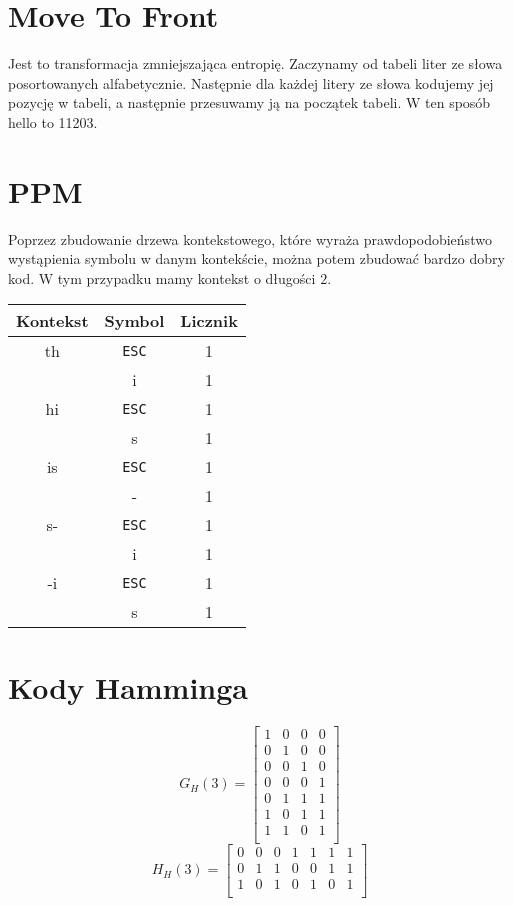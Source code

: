\documentclass{../notatki}
\begin{document}
\begin{multicols}{2}
  \section{Move To Front}

  Jest to transformacja zmniejszająca entropię. Zaczynamy od tabeli liter
  ze słowa posortowanych alfabetycznie. Następnie dla każdej litery ze słowa
  kodujemy jej pozycję w tabeli, a następnie przesuwamy ją na początek
  tabeli. W ten sposób hello to 11203.

  \section{PPM}

  Poprzez zbudowanie drzewa kontekstowego, które wyraża prawdopodobieństwo
  wystąpienia symbolu w danym kontekście, można potem zbudować bardzo dobry
  kod. W tym przypadku mamy kontekst o długości $2$.

  \begin{center}
    \begin{tabular}{c|c|c}
      Kontekst & Symbol & Licznik \\
      \hline
      th & \texttt{ESC} & 1 \\
      & i & 1 \\
      \hline
      hi & \texttt{ESC} & 1 \\
      & s & 1 \\
      \hline
      is & \texttt{ESC} & 1 \\
      & - & 1 \\
      \hline
      s- & \texttt{ESC} & 1 \\
      & i & 1 \\
      \hline
      -i & \texttt{ESC} & 1 \\
      & s & 1 \\
    \end{tabular}
  \end{center}

  \section{Kody Hamminga}

  $$
  G_H(3) =
  \begin{bmatrix}
    1 & 0 & 0 & 0 \\
    0 & 1 & 0 & 0 \\
    0 & 0 & 1 & 0 \\
    0 & 0 & 0 & 1 \\
    0 & 1 & 1 & 1 \\
    1 & 0 & 1 & 1 \\
    1 & 1 & 0 & 1 \\
  \end{bmatrix}
  $$
  $$
  H_H(3) =
  \begin{bmatrix}
    0 & 0 & 0 & 1 & 1 & 1 & 1 \\
    0 & 1 & 1 & 0 & 0 & 1 & 1 \\
    1 & 0 & 1 & 0 & 1 & 0 & 1 \\
  \end{bmatrix}
  $$

\end{multicols}
\end{document}

